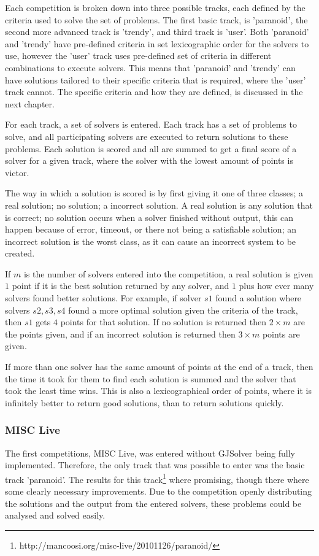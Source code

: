 Each competition is broken down into three possible tracks, each defined by the criteria used to solve the set of problems.
The first basic track, is 'paranoid', the second more advanced track is 'trendy', and third track is 'user'.
Both 'paranoid' and 'trendy' have pre-defined criteria in set lexicographic order for the solvers to use, 
however the 'user' track uses pre-defined set of criteria in different combinations to execute solvers.
This means that 'paranoid' and 'trendy' can have solutions tailored to their specific criteria that is required, where the 'user' track cannot.
The specific criteria and how they are defined, is discussed in the next chapter.

For each track, a set of solvers is entered.
Each track has a set of problems to solve, and all participating solvers are executed to return solutions to these problems.
Each solution is scored and all are summed to get a final score of a solver for a given track, where the solver with the lowest amount of points is victor.

The way in which a solution is scored is by first giving it one of three classes; a real solution; no solution; a incorrect solution.
A real solution is any solution that is correct; no solution occurs when a solver finished without output, this can happen because of error, timeout, or there not being a satisfiable solution;
an incorrect solution is the worst class, as it can cause an incorrect system to be created.

If $m$ is the number of solvers entered into the competition,
a real solution is given $1$ point if it is the best solution returned by any solver, and $1$ plus how ever many solvers found better solutions.
For example, if solver $s1$ found a solution where solvers $s2,s3,s4$ found a more optimal solution given the criteria of the track, then $s1$ gets $4$ points for that solution.
If no solution is returned then $2\times m$ are the points given, and if an incorrect solution is returned then $3 \times m$ points are given.

If more than one solver has the same amount of points at the end of a track, then the time it took for them to find each solution is summed and the solver that took the least time wins.
This is also a lexicographical order of points, where it is infinitely better to return good solutions, than to return solutions quickly.

\subsubsection{MISC Live}
The first competitions, MISC Live, was entered without GJSolver being fully implemented.
Therefore, the only track that was possible to enter was the basic track 'paranoid'.
The results for this track\footnote{http://mancoosi.org/misc-live/20101126/paranoid/} where promising, though there where some clearly necessary improvements.
Due to the competition openly distributing the solutions and the output from the entered solvers, these problems could be analysed and solved easily.

